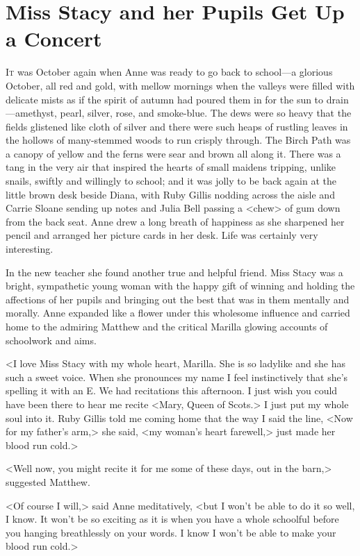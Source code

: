 \chapter{Miss Stacy and her Pupils Get Up a Concert}

\lettrine[]{I}{t} was October again when Anne was ready to go back to school—a glorious October, all red and gold, with mellow mornings when the valleys were filled with delicate mists as if the spirit of autumn had poured them in for the sun to drain—amethyst, pearl, silver, rose, and smoke-blue. The dews were so heavy that the fields glistened like cloth of silver and there were such heaps of rustling leaves in the hollows of many-stemmed woods to run crisply through. The Birch Path was a canopy of yellow and the ferns were sear and brown all along it. There was a tang in the very air that inspired the hearts of small maidens tripping, unlike snails, swiftly and willingly to school; and it was jolly to be back again at the little brown desk beside Diana, with Ruby Gillis nodding across the aisle and Carrie Sloane sending up notes and Julia Bell passing a <chew> of gum down from the back seat. Anne drew a long breath of happiness as she sharpened her pencil and arranged her picture cards in her desk. Life was certainly very interesting.

In the new teacher she found another true and helpful friend. Miss Stacy was a bright, sympathetic young woman with the happy gift of winning and holding the affections of her pupils and bringing out the best that was in them mentally and morally. Anne expanded like a flower under this wholesome influence and carried home to the admiring Matthew and the critical Marilla glowing accounts of schoolwork and aims.

<I love Miss Stacy with my whole heart, Marilla. She is so ladylike and she has such a sweet voice. When she pronounces my name I feel instinctively that she's spelling it with an E\@. We had recitations this afternoon. I just wish you could have been there to hear me recite <Mary, Queen of Scots.> I just put my whole soul into it. Ruby Gillis told me coming home that the way I said the line, <Now for my father's arm,> she said, <my woman's heart farewell,> just made her blood run cold.>

<Well now, you might recite it for me some of these days, out in the barn,> suggested Matthew.

<Of course I will,> said Anne meditatively, <but I won't be able to do it so well, I know. It won't be so exciting as it is when you have a whole schoolful before you hanging breathlessly on your words. I know I won't be able to make your blood run cold.>

